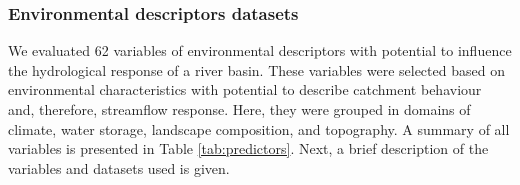 \documentclass[12pt]{article}
\begin{document}
\subsubsection{Environmental descriptors datasets} \label{sec:datagen:input:descriptors}

\par We evaluated 62 variables of environmental descriptors with potential to influence the hydrological response of a river basin. These variables were selected based on environmental characteristics with potential to describe catchment behaviour and, therefore, streamflow response. Here, they were grouped in domains of climate, water storage, landscape composition, and topography. A summary of all variables is presented in Table \ref{tab:predictors}. Next, a brief description of the variables and datasets used is given.
\end{document}
